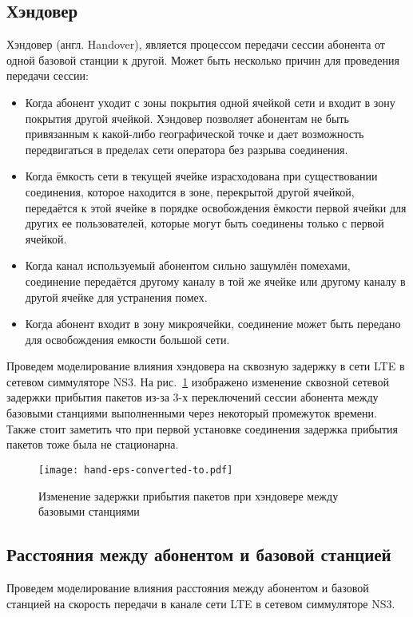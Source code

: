 \subsection{Хэндовер}  \label{handover_chapter2}
Хэндовер (англ. Handover), является процессом передачи сессии абонента от одной базовой станции к другой. Может быть несколько причин для проведения передачи сессии:
\begin{itemize}
\item Когда абонент уходит с зоны покрытия одной ячейкой сети и входит в зону покрытия другой ячейкой. Хэндовер позволяет абонентам не быть привязанным к какой-либо географической точке и дает возможность передвигаться в пределах сети оператора без разрыва соединения.
\item Когда ёмкость сети в текущей ячейке израсходована при существовании соединения, которое находится в зоне, перекрытой другой ячейкой, передаётся к этой ячейке в порядке освобождения ёмкости первой ячейки для других ее пользователей, которые могут быть соединены только с первой ячейкой.
\item Когда канал используемый абонентом сильно зашумлён помехами, соединение передаётся другому каналу в той же ячейке или другому каналу в другой ячейке для устранения помех.
\item Когда абонент входит в зону микроячейки, соединение может быть передано для освобождения емкости большой сети.
\end{itemize}
Проведем моделирование влияния хэндовера на сквозную задержку в сети LTE в сетевом симмуляторе NS3.
На рис. \ref{img:hand} изображено изменение сквозной сетевой задержки прибытия пакетов из-за 3-х переключений сессии абонента между базовыми станциями выполненными через некоторый промежуток времени. Также стоит заметить что при первой установке соединения задержка прибытия пакетов тоже была не стационарна.

\begin{figure} [h]
  \center
\texttt{[image: hand-eps-converted-to.pdf]}
  \caption{Изменение задержки прибытия пакетов при хэндовере между базовыми станциями}
  \label{img:hand}
\end{figure}

\subsection{Расстояния между абонентом и базовой станцией}  \label{sect2_2_2}
Проведем моделирование влияния расстояния между абонентом и базовой станцией на скорость передачи в канале сети LTE в сетевом симмуляторе NS3.




